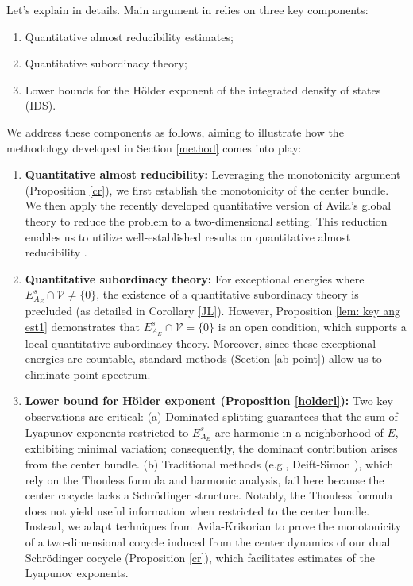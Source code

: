 \documentclass[11pt]{amsart}
\theoremstyle{remark}
\theoremstyle{definition}
\begin{document}
Let's explain in details. Main argument in \cite{Avila: ac} relies on three key components:
\begin{enumerate}
    \item Quantitative almost reducibility estimates;
    \item Quantitative subordinacy theory;
    \item Lower bounds for the H\"older exponent of the integrated density of states (IDS).
\end{enumerate}
We address these components as follows, aiming to illustrate how the methodology developed in Section \ref{method} comes into play:
\begin{enumerate}
\item \textbf{Quantitative almost reducibility:} Leveraging the monotonicity argument (Proposition \ref{cr}), we first establish the monotonicity of the center bundle. We then apply the recently developed quantitative version of Avila's global theory \cite{GJYZ} to reduce the problem to a two-dimensional setting. This reduction enables us to utilize well-established results on quantitative almost reducibility \cite{Avila: ac, Eli92, LYZZ,WXYZZ}.
\item \textbf{Quantitative subordinacy theory:} For exceptional energies where \( E^s_{A_E} \cap \mathcal{V} \neq \{0\} \), the existence of a quantitative subordinacy theory is precluded (as detailed in Corollary \ref{JL}). However, Proposition \ref{lem: key ang est1} demonstrates that \( E^s_{A_E} \cap \mathcal{V} = \{0\} \) is an open condition, which supports a local quantitative subordinacy theory. Moreover, since these exceptional energies are countable, standard methods (Section \ref{ab-point}) allow us to eliminate point spectrum.  
\item \textbf{Lower bound for Hölder exponent (Proposition \ref{holderl}):} Two key observations are critical: 
(a) Dominated splitting guarantees that the sum of Lyapunov exponents restricted to \( E^s_{A_E} \) are harmonic in a neighborhood of \( E \), exhibiting minimal variation; consequently, the dominant contribution arises from the center bundle.  
(b) Traditional methods (e.g., Deift-Simon \cite{DeS}), which rely on the Thouless formula and harmonic analysis, fail here because the center cocycle lacks a Schrödinger structure. Notably, the Thouless formula does not yield useful information when restricted to the center bundle. Instead, we adapt techniques from Avila-Krikorian \cite{AK} to prove the monotonicity of a two-dimensional cocycle induced from the center dynamics of our dual Schr\"odinger cocycle (Proposition \ref{cr}), which facilitates estimates of the Lyapunov exponents.  
\end{enumerate}
\end{document}
